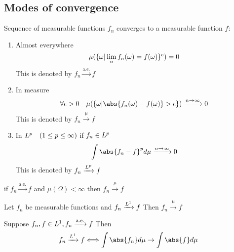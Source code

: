 \subsection{Modes of convergence}
\begin{dfn}
Sequence of measurable functions $f_n$ converges to a measurable function $f$:
\begin{enumerate}
    \item Almost everywhere
    \begin{equation*}
        \mu(\{\omega| \lim\limits_{n} f_n(\omega) = f(\omega)\}^c) = 0
    \end{equation*}
    This is denoted by $f_n \xrightarrow{\text{a.e.}}f$
    \item In measure 
    \begin{equation*}
        \forall \epsilon >0 \quad \mu(\{\omega| \abs{f_n(\omega) - f(\omega)}>\epsilon \}) \xrightarrow{n \rightarrow \infty} 0
    \end{equation*}
    This is denoted by $f_n \xrightarrow{\mu}f$
    \item In $L^{p} \quad (1\leq p \leq \infty)$ if $f_n\in L^{p}$ \begin{equation*}
        \int \abs{f_n - f}^p d\mu \xrightarrow{n \rightarrow \infty} 0
    \end{equation*}
    This is denoted by $f_n \xrightarrow{L^{p}}f$
\end{enumerate}
\end{dfn}
\begin{lem} if $f_n \xrightarrow{\text{a.e.}}f$ and $\mu(\Omega) < \infty$ then $f_n \xrightarrow{\mu}f$
\end{lem}
\begin{lem}\label{l1mu}
Let $f_n$ be measurable functions and $f_n \xrightarrow{L^{1}}f$ Then $f_n \xrightarrow{\mu}f$
\end{lem}
\begin{lem} Suppose $f_n, f\in L^{1}, f_n \xrightarrow{\text{a.e.}}f$ Then
\begin{equation*}
    f_n \xrightarrow{\ls{1}}f \Longleftrightarrow \int \abs{f_n} d\mu \rightarrow \int \abs{f} d\mu
\end{equation*}
\end{lem}

